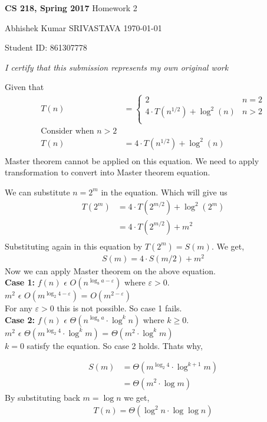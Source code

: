 \documentclass[a4paper,11pt]{article}
\renewcommand{\maketitle}{%
	
	\Large
 	\textbf{CS 218, Spring 2017}
 	\hfill
 	Homework 2
 	\par
 	
	\Large
	Abhishek Kumar SRIVASTAVA
	\hfill
	\normalsize
	\today
 	\par
 	Student ID: 861307778
 	\par
 	
 	\begin{center}

 	\vspace{.2in}
 	
 	\textit{I certify that this submission represents my own original work }
 	\par
	\vspace{.2in}
	\makebox[3.0in]{\hrulefill}
	\par

 	\end{center}
 	
 	\hrulefill
 	\par \vspace{2ex}
 	}
\theoremstyle{quest}
\newenvironment{solution}[2][Solution]{\begin{trivlist}
		\item[\hskip \labelsep {\bfseries #1}\hskip \labelsep {\bfseries #2.}]}{\end{trivlist}}
\begin{document}
\thispagestyle{empty}
	
\maketitle

\begin{solution}1	
	Given that 
	\begin{align*}
	T(n)&=\begin{cases}
	2 & \text{$n = 2$}\\
	4 \cdot T({n}^{1/2}) + {\log}^2(n) & \text{$n > 2$} \\
	\end{cases}\\
	\text{Consider when $n > 2$}\\
	T(n)&= 4 \cdot T({n}^{1/2}) + {\log}^2(n) \\
	\end{align*}
	Master theorem cannot be applied on this equation. We need to apply transformation to convert into Master theorem equation.
	
	We can substitute $n = 2^m$ in the equation. Which will give us
	\begin{align*}
	T(2^m)&= 4 \cdot T(2^{m/2}) + \log^2(2^m) \\
	&=  4 \cdot T(2^{m/2}) + m^2 \\
	\end{align*}
	Substituting again in this equation by $T(2^m) = S(m)$. We get,
	\begin{align*}
	S(m) = 4 \cdot S(m/2) + m^2
	\end{align*}
	Now we can apply Master theorem on the above equation.\\

	\textbf{Case 1:} $f(n)$ $\epsilon$ $O(n^{\log_b{a} - \varepsilon})$ where $\varepsilon > 0$.\\
	
	$m^2$ $\epsilon$ $O(m^{\log_2{4} - \varepsilon})$ = $O(m^{2 - \varepsilon})$\\
	
	For any $\varepsilon > 0$ this is not possible. So case 1 fails.\\
	
	\textbf{Case 2:} $f(n)$ $\epsilon$ $\Theta(n^{\log_b{a}}\cdot \log^k n)$ where $k \ge 0$.\\
	
	$m^2$ $\epsilon$ $\Theta(m^{\log_2{4}}\cdot \log^k m)$ = $\Theta(m^{2}\cdot \log^k m)$\\
	
	$k = 0$ satisfy the equation. So case 2 holds. Thats why,
	
	\begin{align*}
	S(m) &= \Theta(m^{\log_2{4}}\cdot \log^{k+1}m)\\
	&= \Theta(m^{2}\cdot \log{m})
	\end{align*}
	By substituting back $m = \log{n}$ we get,
	\begin{align*}
	\boxed{T(n) = \Theta(\log^2{n}\cdot \log{\log{n}})}
	\end{align*}
\end{solution}
\end{document}
